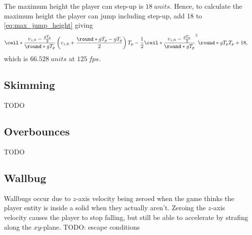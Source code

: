 The maximum height the player can step-up is $\qty{18}{units}$.
Hence, to calculate the maximum height the player can jump including step-up, add 18 to \eqref{eq:max_jump_height} giving
\begin{align}
\label{eq:max_jump_height_stepup}
\ceil*{\frac{v_{z,0} - \frac{gT_p}{2}}{\round*{gT_p}}}\left(v_{z,0} + \frac{\round*{gT_p} - gT_p}{2} \right) T_p - \frac{1}{2}\ceil*{\frac{v_{z,0} - \frac{gT_p}{2}}{\round*{gT_p}}}^2 \round*{gT_p} T_p + 18,
\end{align}
which is $\qty{66.528}{units}$ at $\qty{125}{fps}$.


\subsection{Skimming}
\label{sec:skimming}
TODO


\subsection{Overbounces}
\label{sec:overbounce}
TODO%


\subsection{Wallbug}
\label{sec:wallbug}
Wallbugs occur due to $z$-axis velocity being zeroed when the game thinks the player entity is inside a solid when they actually aren't.
Zeroing the $z$-axis velocity causes the player to stop falling, but still be able to accelerate by strafing along the $xy$-plane.
TODO: escape conditions
